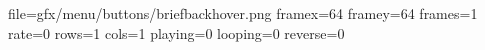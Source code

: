 file=gfx/menu/buttons/briefbackhover.png
framex=64
framey=64
frames=1
rate=0
rows=1
cols=1
playing=0
looping=0
reverse=0